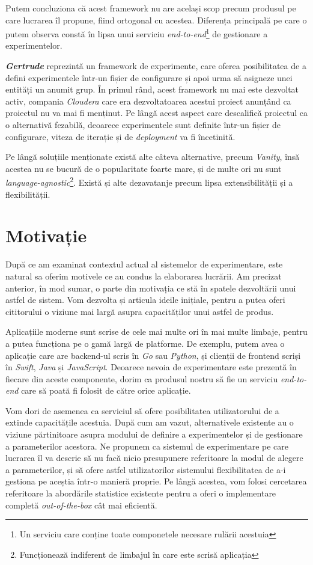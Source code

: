 Putem concluziona că acest framework nu are același scop precum produsul pe care lucrarea îl propune, fiind ortogonal cu acestea. Diferența principală pe care o putem observa constă în lipsa unui serviciu \textit{end-to-end}\footnote{Un serviciu care conține toate componetele necesare rulării acestuia} de gestionare a experimentelor.

\textbf{\textit{Gertrude}} reprezintă un framework de experimente, care oferea posibilitatea de a defini experimentele într-un fișier de configurare și apoi urma să asigneze unei entități un anumit grup. În primul rând, acest framework nu mai este dezvoltat activ, compania \textit{Cloudera} care era dezvoltatoarea acestui proiect anunțând ca proiectul nu va mai fi menținut. Pe lângă acest aspect care descalifică proiectul ca o alternativă fezabilă, deoarece experimentele sunt definite într-un fișier de configurare, viteza de iterație și de \textit{deployment} va fi încetinită. 

Pe lângă soluțiile menționate există alte câteva alternative, precum \textit{Vanity}, însă acestea nu se bucură de o popularitate foarte mare, și de multe ori nu sunt \textit{language-agnostic}\footnote{Funcționează indiferent de limbajul în care este scrisă aplicația}. Există și alte dezavatanje precum lipsa extensibilității și a flexibilității.

\section{Motivație}

După ce am examinat contextul actual al sistemelor de experimentare, este natural sa oferim motivele ce au condus la elaborarea lucrării. Am precizat anterior, în mod sumar, o parte din motivația ce stă în spatele dezvoltării unui astfel de sistem. Vom dezvolta și articula ideile inițiale, pentru a putea oferi cititorului o viziune mai largă asupra capacităților unui astfel de produs.

Aplicațiile moderne sunt scrise de cele mai multe ori în mai multe limbaje, pentru a putea funcționa pe o gamă largă de platforme. De exemplu, putem avea o aplicație care are backend-ul scris în \textit{Go} sau \textit{Python}, și clienții de frontend scriși în \textit{Swift}, \textit{Java} și \textit{JavaScript}. Deoarece nevoia de experimentare este prezentă în fiecare din aceste componente, dorim ca produsul nostru să fie un serviciu \textit{end-to-end} care să poată fi folosit de către orice aplicație. 

Vom dori de asemenea ca serviciul să ofere posibilitatea utilizatorului de a extinde capacitățile acestuia. După cum am vazut, alternativele existente au o viziune părtinitoare asupra modului de definire a experimentelor și de gestionare a parameterilor acestora. Ne propunem ca sistemul de experimentare pe care lucrarea îl va descrie să nu facă nicio presupunere referitoare la modul de alegere a parameterilor, și să ofere astfel utilizatorilor sistemului flexibilitatea de a-i gestiona pe aceștia într-o manieră proprie. Pe lângă acestea, vom folosi cercetarea referitoare la abordările statistice existente pentru a oferi o implementare completă \textit{out-of-the-box} cât mai eficientă.

